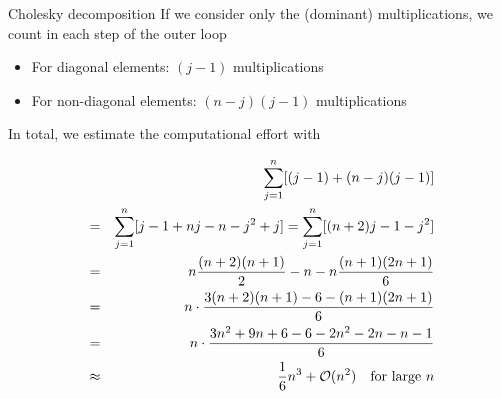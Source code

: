 \begin{vbframe}{Cholesky decomposition}
If we consider only the (dominant) multiplications, we count in each step of the outer loop

\begin{itemize}
\item For diagonal elements: $(j-1)$ multiplications
\item For non-diagonal elements: $(n-j)(j-1)$ multiplications
\end{itemize}

In total, we estimate the computational effort with

\vspace*{-0.4cm}
\begin{eqnarray*}
 & &\sum_{j=1}^n [(j - 1) + (n - j)(j - 1)] \\
&=& \sum_{j=1}^n [j - 1 + nj - n - j^2 + j] = \sum_{j=1}^n[(n + 2) j - 1 - j^2] \\
&=&
n \frac{(n + 2) (n + 1)}{2} - n - n\frac{(n+1)(2n+ 1)}{6} \\
&=& n \cdot \frac{3(n + 2)(n + 1) - 6 - (n + 1)(2n + 1)}{6} \\
&=& n \cdot \frac{3n^2 + 9n + 6 - 6 - 2n^2 - 2n - n - 1} {6}\\
&\approx& \frac{1}{6}n^3 + \mathcal{O}(n^2) \quad \text{for large }n
\end{eqnarray*}

\framebreak
\end{vbframe}

